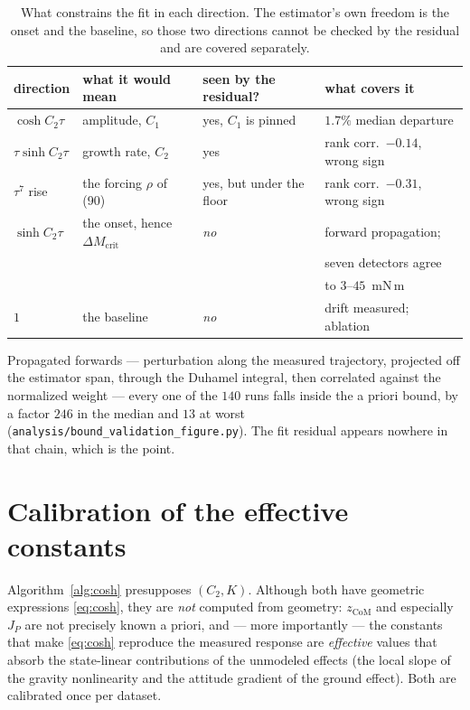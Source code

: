 \documentclass[10pt]{article}
\begin{document}
\begin{table}[htbp]
\centering\small
\caption{What constrains the fit in each direction. The estimator's own
freedom is the onset and the baseline, so those two directions cannot be
checked by the residual and are covered separately.}
\label{tab:dirs}
\begin{tabular}{@{}llll@{}}
\toprule
direction & what it would mean & seen by the residual? & what covers it \\
\midrule
$\cosh C_2\tau$ & amplitude, $C_1$ & yes, $C_1$ is pinned
  & $1.7\%$ median departure \\
$\tau\sinh C_2\tau$ & growth rate, $C_2$ & yes
  & rank corr.\ $-0.14$, wrong sign \\
$\tau^7$ rise & the forcing $\rho$ of (90) & yes, but under the floor
  & rank corr.\ $-0.31$, wrong sign \\
$\sinh C_2\tau$ & the onset, hence $\Delta M_{\mathrm{crit}}$ & \emph{no}
  & forward propagation; \\
 & & & seven detectors agree \\
 & & & to $3$--$45$~mN\,m \\
$1$ & the baseline & \emph{no} & drift measured; ablation \\
\bottomrule
\end{tabular}
\end{table}

Propagated forwards — perturbation along the measured trajectory,
projected off the estimator span, through the Duhamel integral, then
correlated against the normalized weight — every one of the $140$ runs
falls inside the a priori bound, by a factor $246$ in the median and
$13$ at worst (\texttt{analysis/bound\_validation\_figure.py}). The fit
residual appears nowhere in that chain, which is the point.

\section{Calibration of the effective constants}
\label{sec:calibration}

Algorithm~\ref{alg:cosh} presupposes $(C_2, K)$. Although both have
geometric expressions \eqref{eq:cosh}, they are \emph{not} computed from
geometry: $z_{\mathrm{CoM}}$ and especially $J_P$ are not precisely known
a priori, and — more importantly — the constants that make
\eqref{eq:cosh} reproduce the measured response are \emph{effective}
values that absorb the state-linear contributions of the unmodeled
effects (the local slope of the gravity nonlinearity and the attitude
gradient of the ground effect). Both are calibrated once per dataset.
\end{document}
